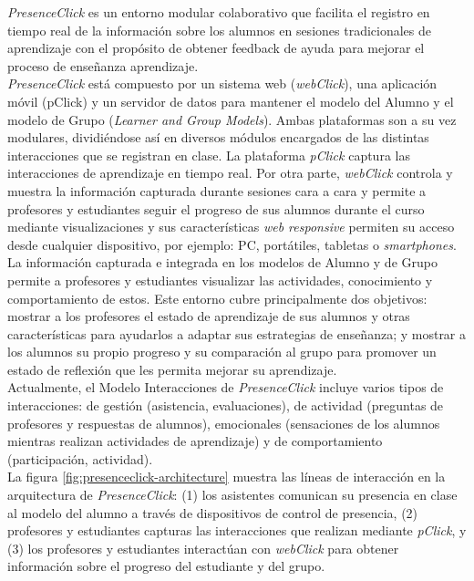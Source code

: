 \textit{PresenceClick} es un entorno modular colaborativo que facilita el registro en tiempo real de la información sobre los alumnos en sesiones tradicionales de aprendizaje con el propósito de obtener feedback de ayuda para mejorar el proceso de enseñanza aprendizaje.\\ 

\textit{PresenceClick} está compuesto por un sistema web (\textit{webClick}), una aplicación móvil (pClick) y un servidor de datos para mantener el modelo del Alumno y el modelo de Grupo (\textit{Learner and Group Models}). Ambas plataformas son a su vez modulares, dividiéndose así en diversos módulos encargados de las distintas interacciones que se registran en clase. La plataforma \textit{pClick} captura las interacciones de aprendizaje en tiempo real. Por otra parte, \textit{webClick} controla y muestra la información capturada durante sesiones cara a cara y permite a profesores y estudiantes seguir el progreso de sus alumnos durante el curso mediante visualizaciones y sus características \textit{web responsive} permiten su acceso desde cualquier dispositivo, por ejemplo: PC, portátiles, tabletas o \textit{smartphones}. La información capturada e integrada en los modelos de Alumno y de Grupo permite a profesores y estudiantes visualizar las actividades, conocimiento y comportamiento de estos. Este entorno cubre principalmente dos objetivos: mostrar a los profesores el estado de aprendizaje de sus alumnos y otras características para ayudarlos a adaptar sus estrategias de enseñanza; y mostrar a los alumnos su propio progreso y su comparación al grupo para promover un estado de reflexión que les permita mejorar su aprendizaje.\\

Actualmente, el Modelo Interacciones de \textit{PresenceClick} incluye varios tipos de interacciones: de gestión (asistencia, evaluaciones), de actividad (preguntas de profesores y respuestas de alumnos), emocionales (sensaciones de los alumnos mientras realizan actividades de aprendizaje) y de comportamiento (participación, actividad).\\

La figura \ref{fig:presenceclick-architecture} muestra las líneas de interacción en la arquitectura de \textit{PresenceClick}: (1) los asistentes comunican su presencia en clase al modelo del alumno a través de dispositivos de control de presencia, (2) profesores y estudiantes capturas las interacciones que realizan mediante \textit{pClick}, y (3) los profesores y estudiantes interactúan con \textit{webClick} para obtener información sobre el progreso del estudiante y del grupo.\\

